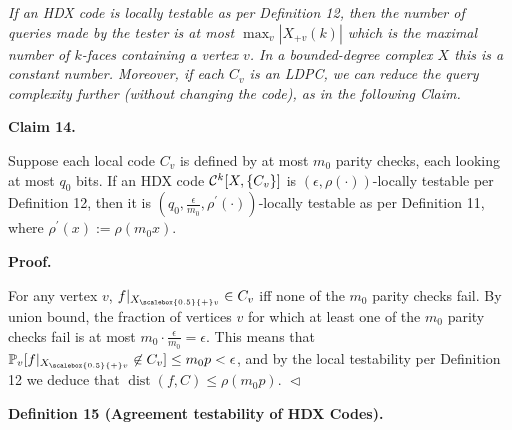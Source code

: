 \emph{If an HDX code is locally testable as per Definition 12, then the number of queries made by the tester is at most $\max_{v}|X_{+v}(k)|$ which is the maximal number of $k$-faces containing a vertex $v$. In a bounded-degree complex $X$ this is a constant number.
Moreover, if each $C_{v}$ is an LDPC, we can reduce the query complexity further (without changing the code), as in the following Claim.}\par







\par\medskip\noindent\textbf{
Claim 14. 
}\par



Suppose each local code $C_{v}$ is defined by at most $m_{0}$ parity checks, each looking at most $q_{0}$ bits. If an HDX code ${\cal C}^{k}[X,\{C_{v}\}]$ is $(\epsilon,\rho(\cdot))$-locally testable per Definition 12, then it is $(q_{0},\frac{\epsilon}{m_{0}},\rho^{\prime}(\cdot))$-locally testable as per Definition 11, where $\rho^{\prime}(x):=\rho(m_{0}x)$.\par






\par\medskip\noindent\textbf{
\textbf{Proof}.}\par




For any vertex $v$, $f|_{{X}_{\scalebox{0.5}{+}v}}\in C_{v}$ iff none of the $m_{0}$ parity checks fail. By union bound, the fraction of vertices $v$ for which at least one of the $m_{0}$ parity checks fail is at most $m_{0}\cdot\frac{\epsilon}{m_{0}}=\epsilon$. This means that $\operatorname*{\mathbb{P}}_{v}[f|_{{X}_{\scalebox{0.5}{+}v}}\not\in C_{v}]\leq
m_{0}p<\epsilon$, and by the local testability per Definition 12 we deduce that $\operatorname{dist}(f,C)\leq\rho(m_{0}p)$.
$\vartriangleleft$\par





\par\medskip\noindent\textbf{
\textbf{Definition 15}\textbf{ }(Agreement testability of HDX Codes)\textbf{.}
}\par



